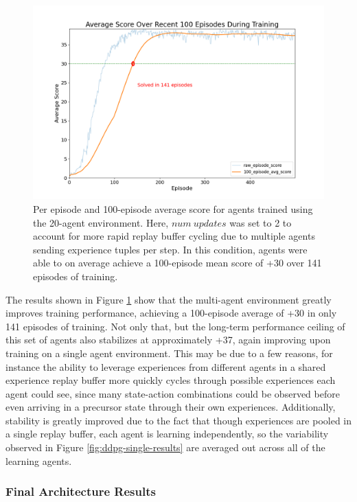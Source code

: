 \documentclass[11pt]{article}
\begin{document}
\begin{figure}[!ht]
	\centering
	\includegraphics[width=0.75\linewidth]{images/ddpg-multi-results.png}
	\caption{Per episode and 100-episode average score for agents trained using the 20-agent environment. Here, $num\ updates$ was set to 2 to account for more rapid replay buffer cycling due to multiple agents sending experience tuples per step. In this condition, agents were able to on average achieve a 100-episode mean score of +30 over 141 episodes of training.}
	\label{fig:ddpg-multi-results}
\end{figure}

\FloatBarrier

The results shown in Figure \ref{fig:ddpg-multi-results} show that the multi-agent environment greatly improves training performance, achieving a 100-episode average of +30 in only 141 episodes of training. Not only that, but the long-term performance ceiling of this set of agents also stabilizes at approximately +37, again improving upon training on a single agent environment. This may be due to a few reasons, for instance the ability to leverage experiences from different agents in a shared experience replay buffer more quickly cycles through possible experiences each agent could see, since many state-action combinations could be observed before even arriving in a precursor state through their own experiences. Additionally, stability is greatly improved due to the fact that though experiences are pooled in a single replay buffer, each agent is learning independently, so the variability observed in Figure \ref{fig:ddpg-single-results} are averaged out across all of the learning agents.

\subsubsection{Final Architecture Results}
\end{document}
